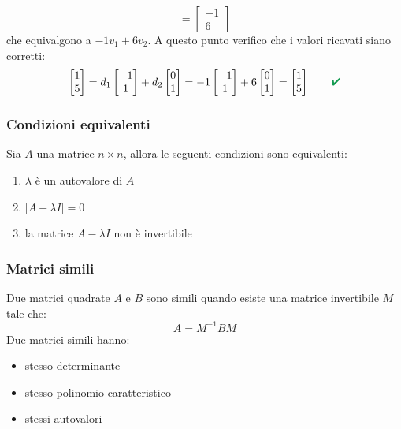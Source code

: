 \documentclass[italian]{article}
\renewcommand{\checkmark}{\textcolor{ForestGreen}{\text{$\qquad$\ding{52}}}}
\begin{document}
\begin{itemize}
\[			=
			\begin{bmatrix}-1\\6\end{bmatrix}
		\]
		che equivalgono a $-1v_1 + 6v_2$. A questo punto verifico che i valori ricavati siano corretti:
		\[
			\begin{bmatrix}1\\5\end{bmatrix}
			=
			d_1\begin{bmatrix}-1\\1\end{bmatrix}
			+
			d_2\begin{bmatrix}0\\1\end{bmatrix}
			=
			-1\begin{bmatrix}-1\\1\end{bmatrix}
			+
			6\begin{bmatrix}0\\1\end{bmatrix}
			=
			\begin{bmatrix}1\\5\end{bmatrix}
			\checkmark
		\]
\end{itemize}

\newpage
\subsubsection{Condizioni equivalenti}
Sia $A$ una matrice $n \times n$, allora le seguenti condizioni sono equivalenti:
\begin{enumerate}[label=\Roman*.]
	\item $\lambda$ è un autovalore di $A$
	\item $| A -\lambda I| = 0 $
	\item la matrice $A - \lambda I $ non è invertibile
\end{enumerate}

\subsubsection{Matrici simili}
Due matrici quadrate $A$ e $B$ sono simili quando esiste una matrice invertibile $M$ tale che:
\[
	A = M^{-1}BM
\]
Due matrici simili hanno:
\begin{itemize}[noitemsep]
	\item stesso determinante
	\item stesso polinomio caratteristico
	\item stessi autovalori
\end{itemize}
\end{document}
